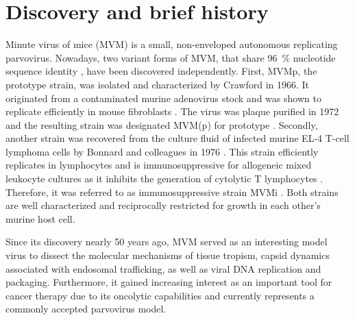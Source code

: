 
\chapter{Discovery and brief history} %

\label{Chapter1} %


\graphicspath{{./Pictures/}}

\label{sec:Discovery and brief history}
Minute virus of mice (MVM) is a small, non-enveloped autonomous replicating parvovirus. Nowadays, two variant forms of MVM, that share 96~\% nucleotide sequence identity \cite{pmid3855242}, have been discovered independently. 
First, MVMp, the prototype strain, was isolated and characterized by Crawford in 1966. It originated from a contaminated murine adenovirus stock and was shown to replicate efficiently in mouse fibroblasts \cite{pmid5945715}. The virus was plaque purified in 1972 \cite{pmid4673484} and the resulting strain was designated MVM(p) for prototype \cite{MVMp}. Secondly, another strain was recovered from the culture fluid of infected murine EL-4 T-cell lymphoma cells by Bonnard and colleagues in 1976 \cite{pmid1244418}. This strain efficiently replicates in lymphocytes and is immunosuppressive for allogeneic mixed leukocyte cultures as it inhibits the generation of cytolytic T lymphocytes \cite{pmid6457871}. Therefore, it was referred to as immunosuppressive strain MVMi \cite{pmid6264106}. Both strains are well characterized and reciprocally restricted for growth in each other’s murine host cell.  

Since its discovery nearly 50 years ago, MVM served as an interesting model virus to dissect the molecular mechanisms of tissue tropism, capsid dynamics associated with endosomal trafficking, as well as viral DNA replication and packaging. Furthermore, it gained increasing interest as an important tool for cancer therapy due to its oncolytic capabilities and currently represents a commonly accepted parvovirus model.     

